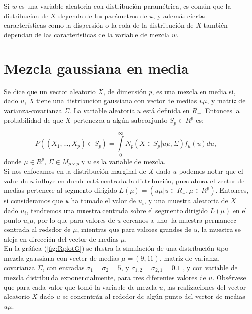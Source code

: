 Si $w$ es una variable aleatoria con distribución paramétrica, es común que la distribución de $X$ dependa de los parámetros de $u$, y además ciertas características como la dispersión o la cola de la distribución de $X$ también dependan de las características de la variable de mezcla $w$.\\

\section{Mezcla gaussiana en media}
Se dice que un vector aleatorio $X$, de dimensión $p$, es una mezcla en media si, dado $u$, $X$ tiene una distribución gaussiana con vector de  medias $u\mu$, y matriz de varianza-covarianza $\Sigma$. La variable aleatoria $u$ está definida en $R_{+}$. Entonces la probabilidad de que $X$ pertenezca a algún subconjunto $S_{p}\subset  R^{p}$ es:

\begin{equation*}
P((X_{1},...,X_{p})\in S_{p})=\underset{0}{\overset{\infty }{\int }}N_{p}(X \in S_{p} |u\mu,\Sigma)f_{u}(u)du, 
\end{equation*}
donde  $\mu \in R^{p}$, $\Sigma \in M_{p\times p}$ y $u$ es la variable de mezcla.\\
Si nos enfocamos en la distribución marginal de $X$ dado $u$ podemos notar que el valor de $u$ influye en donde está centrada la distribución, pues ahora el vector de medias pertenece al segmento dirigido $L(\mu)=( u\mu | u\in R_{+}, \mu\in R^{p})$. Entonces, si consideramos que $u$ ha tomado el valor de $u_{i}$, y una muestra aleatoria de $X$ dado $u_{i}$, tendremos una muestra centrada sobre el segmento dirigido $L(\mu)$ en el punto $u_{i}\mu$, por lo que para valores de $u$ cercanos a uno, la muestra permanece centrada al rededor de $\mu$, mientras que para valores grandes de $u$, la muestra se aleja en dirección del vector de medias $\mu$. \\


En la gráfica (\ref{fig:RplotG}) se ilustra la simulación de una distribución tipo mezcla gaussiana con vector de medias $\mu=(9,11)$, matriz de varianza-covarianza $\Sigma$, con entradas $\sigma_{1}=\sigma_{2}=5$, y $\sigma_{1,2}=\sigma_{2,1}=0.1$
, y con variable de mezcla distribuida exponencialmente, para tres diferentes valores de $u$. Obsérvese que para cada valor que tomó la variable de mezcla $u$, las realizaciones del vector aleatorio $X$ dado $u$ se concentrán al rededor 
de algún punto del vector de medias $u\mu$.\\   

